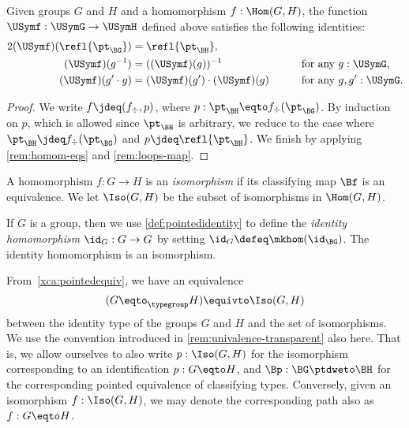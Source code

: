 \begin{lemma}\label{lem:grouphomomaxioms}
  Given groups $G$ and $H$ and a homomorphism $f : \Hom(G,H)$, the function $\USymf : \USymG \to \USymH$ defined above satisfies
  the following identities:
  \begin{alignat}2
    \label{gp-homo-unit} (\USymf) ( \refl {\pt_{\BG}} )
    &= \refl{\pt_{\BH}},   &\qquad&                                        \\
    \label{gp-homo-comp} (\USymf) (g ^ {-1})
    &= ((\USymf) (g))^{-1}                   && \text{for any $g : \USymG$,} \\
    \label{gp-homo-inv}  (\USymf) (g' \cdot g)
    &=  (\USymf) (g') \cdot  (\USymf) (g) && \text{for any $g, g' : \USymG$.}
  \end{alignat}
\end{lemma}

\begin{proof}
  We write $f \jdeq (f_\div,p)$, where $p : \pt_{\BH} \eqto f_\div (\pt_{\BG})$.
  By induction on $p$, which is allowed since $\pt_{\BH}$ is arbitrary,
  we reduce to the case where $\pt_{\BH} \jdeq f_\div (\pt_{\BG})$
  and $p\jdeq \refl{\pt_{\BH}}$.
  We finish by applying \cref{rem:homom-eqs} and \ref{rem:loops-map}.
\end{proof}

\begin{definition}\label{def:groupisomorphism}
  A homomorphism $f : G\to H$ is an \emph{isomorphism} if its classifying map $\Bf$ is an equivalence.
  We let $\Iso(G,H)$ be the subset of isomorphisms in $\Hom(G, H)$.
\end{definition}

\begin{definition}\label{def:identity-group-homomorphism}
  If $G$ is a group, then we use \cref{def:pointedidentity} to define the \emph{identity homomorphism} $\id_G : G\to G$ by
  setting $\id_G \defeq \mkhom (\id_\BG)$.  The
  identity homomorphism is an isomorphism.
\end{definition}

\begin{remark}
  \label{remark:groupsasunivalenttype} From~\cref{xca:pointedequiv},
  we have an equivalence
  \[
    (G\eqto_\typegroup H)\equivto \Iso(G,H)
  \]
  between the identity type of the groups $G$ and $H$ and the 
  set of isomorphisms. We use the convention introduced in
  \cref{rem:univalence-transparent} also here. That is,
  we allow ourselves to also write $p : \Iso(G,H)$ for the isomorphism
  corresponding to an identification $p:G\eqto H$,
  and $\Bp : \BG \ptdweto \BH$ for the corresponding pointed equivalence
  of classifying types. Conversely, given an isomorphism
  $f : \Iso(G,H)$, we may denote the corresponding path
  also as $f:G\eqto H$.
\end{remark}


